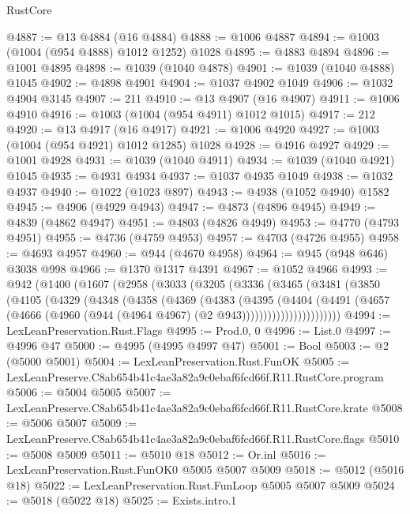 \begin{lexlean}{RustCore}
\begin{coremodule}
@4887 := @13 @4884 (@16 @4884)
@4888 := @1006 @4887
@4894 := @1003 (@1004 (@954 @4888) @1012 @1252) @1028
@4895 := @4883 @4894
@4896 := @1001 @4895
@4898 := @1039 (@1040 @4878)
@4901 := @1039 (@1040 @4888) @1045
@4902 := @4898 @4901
@4904 := @1037 @4902 @1049
@4906 := @1032 @4904 @3145
@4907 := 211
@4910 := @13 @4907 (@16 @4907)
@4911 := @1006 @4910
@4916 := @1003 (@1004 (@954 @4911) @1012 @1015)
@4917 := 212
@4920 := @13 @4917 (@16 @4917)
@4921 := @1006 @4920
@4927 := @1003 (@1004 (@954 @4921) @1012 @1285) @1028
@4928 := @4916 @4927
@4929 := @1001 @4928
@4931 := @1039 (@1040 @4911)
@4934 := @1039 (@1040 @4921) @1045
@4935 := @4931 @4934
@4937 := @1037 @4935 @1049
@4938 := @1032 @4937
@4940 := @1022 (@1023 @897)
@4943 := @4938 (@1052 @4940) @1582
@4945 := @4906 (@4929 @4943)
@4947 := @4873 (@4896 @4945)
@4949 := @4839 (@4862 @4947)
@4951 := @4803 (@4826 @4949)
@4953 := @4770 (@4793 @4951)
@4955 := @4736 (@4759 @4953)
@4957 := @4703 (@4726 @4955)
@4958 := @4693 @4957
@4960 := @944 (@4670 @4958)
@4964 := @945 (@948 @646) @3038 @998
@4966 := @1370 @1317 @4391
@4967 := @1052 @4966
@4993 := @942
    (@1400
      (@1607
        (@2958
          (@3033
            (@3205
              (@3336
                (@3465
                  (@3481
                    (@3850
                      (@4105
                        (@4329
                          (@4348
                            (@4358
                              (@4369
                                (@4383
                                  (@4395
                                    (@4404
                                      (@4491
                                        (@4657
                                          (@4666
                                            (@4960
                                              (@944 (@4964 @4967) (@2 @943)))))))))))))))))))))))
@4994 := LexLeanPreservation.Rust.Flags
@4995 := Prod.{0, 0}
@4996 := List.{0}
@4997 := @4996 @47
@5000 := @4995 (@4995 @4997 @47)
@5001 := Bool
@5003 := @2 (@5000 @5001)
@5004 := LexLeanPreservation.Rust.FunOK
@5005 := LexLeanPreserve.C8ab654b41c4ae3a82a9c0ebaf6fcd66f.R11.RustCore.program
@5006 := @5004 @5005
@5007 := LexLeanPreserve.C8ab654b41c4ae3a82a9c0ebaf6fcd66f.R11.RustCore.krate
@5008 := @5006 @5007
@5009 := LexLeanPreserve.C8ab654b41c4ae3a82a9c0ebaf6fcd66f.R11.RustCore.flags
@5010 := @5008 @5009
@5011 := @5010 @18
@5012 := Or.inl
@5016 := LexLeanPreservation.Rust.FunOK0 @5005 @5007 @5009
@5018 := @5012 (@5016 @18)
@5022 := LexLeanPreservation.Rust.FunLoop @5005 @5007 @5009
@5024 := @5018 (@5022 @18)
@5025 := Exists.intro.{1}

\end{coremodule}
\end{lexlean}
